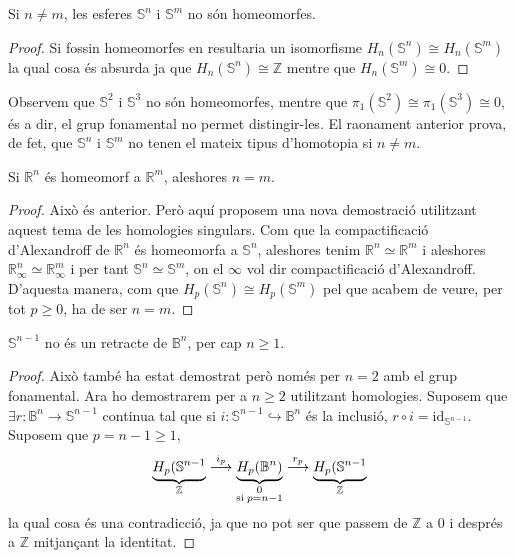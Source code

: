 \documentclass[../main.tex]{subfiles}
\begin{document}
\begin{coro}
Si $n\not=m$, les esferes $\mathbb{S}^n$ i $\mathbb{S}^m$ no són homeomorfes.
\end{coro}
\begin{proof}
Si fossin homeomorfes en resultaria un isomorfisme $H_n(\mathbb{S}^n)\cong H_n(\mathbb{S}^m)$ la qual cosa és absurda ja que $H_n(\mathbb{S}^n)\cong\mathbb{Z}$ mentre que $H_n(\mathbb{S}^m)\cong 0$. 
\end{proof}

Observem que $\mathbb{S}^2$ i $\mathbb{S}^3$ no són homeomorfes, mentre que $\pi_1(\mathbb{S}^2)\cong\pi_1(\mathbb{S}^3)\cong 0$, és a dir, el grup fonamental no permet distingir-les. El raonament anterior prova, de fet, que $\mathbb{S}^n$ i $\mathbb{S}^m$ no tenen el mateix tipus d'homotopia si $n\not=m$.

\begin{coro}
Si $\mathbb{R}^n$ és homeomorf a $\mathbb{R}^m$, aleshores $n = m$.
\end{coro}
\begin{proof}
Això és anterior. Però aquí proposem una nova demostració utilitzant aquest tema de les homologies singulars. Com que la compactificació d'Alexandroff de $\mathbb{R}^n$ és homeomorfa a $\mathbb{S}^n$, aleshores tenim $\mathbb{R}^n\simeq \mathbb{R}^m$ i aleshores $\mathbb{R}^n_\infty\simeq \mathbb{R}^m_\infty$ i per tant $\mathbb{S}^n\simeq \mathbb{S}^m$, on el $\infty$ vol dir compactificació d'Alexandroff. D'aquesta manera, com que $H_p(\mathbb{S}^n)\cong H_p(\mathbb{S}^m)$ pel que acabem de veure, per tot $p\geq 0$, ha de ser $n = m$. 
\end{proof}

\begin{coro}
$\mathbb{S}^{n-1}$ no és un retracte de $\mathbb{B}^n$, per cap $n\geq 1$.
\end{coro}
\begin{proof}
Això també ha estat demostrat però només per $n = 2$ amb el grup fonamental. Ara ho demostrarem per a $n\geq 2$ utilitzant homologies. Suposem que $\exists r:\mathbb{B}^n\rightarrow \mathbb{S}^{n-1}$ continua tal que si $i:\mathbb{S}^{n-1}\hookrightarrow \mathbb{B}^n$ és la inclusió, $r\circ i = \mathrm{id}_{\mathbb{S}^{n-1}}$. Suposem que $p = n-1\geq 1$,
\begin{equation}
    \notag
    \underbrace{H_p(\mathbb{S}^{n-1}}_{\mathbb{Z}}\overset{i_p}{\longrightarrow}\underbrace{H_p(\mathbb{B}^n)}_{\substack{0\\\text{si}\;p=n-1}}\overset{r_p}{\longrightarrow}\underbrace{H_p(\mathbb{S}^{n-1}}_{\mathbb{Z}}
\end{equation}
la qual cosa és una contradicció, ja que no pot ser que passem de $\mathbb{Z}$ a $0$ i després a $\mathbb{Z}$ mitjançant la identitat.
\end{proof}
\end{document}
